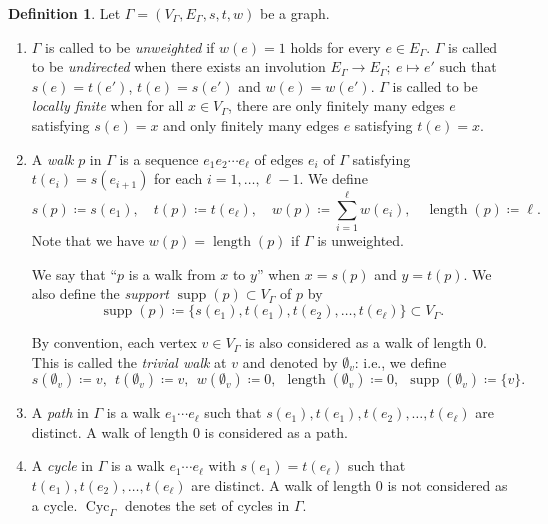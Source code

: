 \documentclass[10pt,a4paper]{amsart}
\theoremstyle{plain}
\theoremstyle{definition}
\newtheorem{defi}[cdrthm]{Definition}
\theoremstyle{remark}
\begin{document}
\begin{defi}
Let $\Gamma = (V_{\Gamma}, E_{\Gamma}, s, t, w)$ be a graph. 

\begin{enumerate}
\item 
$\Gamma$ is called to be \textit{unweighted} if $w(e) = 1$ holds for every $e \in E_{\Gamma}$. 
$\Gamma$ is called to be \textit{undirected} when 
there exists an involution $E_{\Gamma} \to E_{\Gamma};\ e \mapsto e'$
such that $s(e)=t(e')$, $t(e)=s(e')$ and $w(e)=w(e')$. 
$\Gamma$ is called to be \textit{locally finite} when for all $x \in V_{\Gamma}$, 
there are only finitely many edges $e$ satisfying $s(e)=x$ and only finitely many edges $e$ satisfying $t(e)=x$. 

\item
A \textit{walk} $p$ in $\Gamma$ is a sequence $e_1 e_2 \cdots e_{\ell}$ of edges $e_i$ of $\Gamma$ satisfying 
$t(e_i) = s(e_{i+1})$ for each $i = 1, \ldots , \ell -1$. 
We define 
\[
s(p) \coloneqq  s(e_1), \quad
t(p) \coloneqq  t(e_{\ell}), \quad
w(p) \coloneqq  \sum _{i = 1} ^{\ell} w(e_i), \quad 
\operatorname{length}(p) \coloneqq  \ell. 
\]
Note that we have $w(p) = \operatorname{length}(p)$ if $\Gamma$ is unweighted. 


We say that ``$p$ is a walk from $x$ to $y$'' when $x = s(p)$ and $y = t(p)$. 
We also define the \textit{support} $\operatorname{supp}(p) \subset V_{\Gamma}$ of $p$ by
\[
\operatorname{supp}(p) \coloneqq  \{ s(e_1), t(e_1), t(e_2), \ldots , t(e_{\ell}) \} \subset V_{\Gamma}. 
\]

By convention, each vertex $v \in V_{\Gamma}$ is also considered as a walk of length $0$. 
This is called the \textit{trivial walk} at $v$ and denoted by $\emptyset _v$: i.e., 
we define 
\[
s(\emptyset _v) \coloneqq  v, \ \ 
t(\emptyset _v) \coloneqq  v, \ \ 
w(\emptyset _v) \coloneqq  0, \ \  
\operatorname{length}(\emptyset _v) \coloneqq  0, \ \ 
\operatorname{supp}(\emptyset _v) \coloneqq  \{ v \}.
\]

\item 
A \textit{path} in $\Gamma$ is a walk $e_1 \cdots e_{\ell}$ such that $s(e_1), t(e_1), t(e_2), \ldots, t(e_{\ell})$ are distinct. 
A walk of length $0$ is considered as a path. 

\item
A \textit{cycle} in $\Gamma$ is a walk $e_1 \cdots e_{\ell}$ with $s(e_1) = t(e_{\ell})$ 
such that $t(e_1), t(e_2), \ldots, t(e_{\ell})$ are distinct. 
A walk of length $0$ is not considered as a cycle. 
$\operatorname{Cyc}_{\Gamma}$ denotes the set of cycles in $\Gamma$. 


\end{enumerate}
\end{defi}
\end{document}

